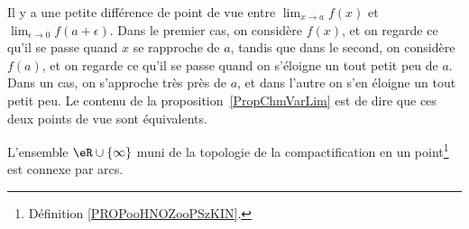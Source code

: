 Il y a une petite différence de point de vue entre $\lim_{x\to a}f(x)$ et $\lim_{\epsilon\to 0}f(a+\epsilon)$. Dans le premier cas, on considère $f(x)$, et on regarde ce qu'il se passe quand $x$ se rapproche de $a$, tandis que dans le second, on considère $f(a)$, et on regarde ce qu'il se passe quand on s'éloigne un tout petit peu de $a$. Dans un cas, on s'approche très près de $a$, et dans l'autre on s'en éloigne un tout petit peu. Le contenu de la proposition~\ref{PropChmVarLim} est de dire que ces deux points de vue sont équivalents.


\begin{proposition}      \label{PROPooLOQVooULDhZz}
    L'ensemble \( \eR\cup\{ \infty \}\) muni de la topologie de la compactification en un point\footnote{Définition \ref{PROPooHNOZooPSzKIN}.} est connexe par arcs.
\end{proposition}


